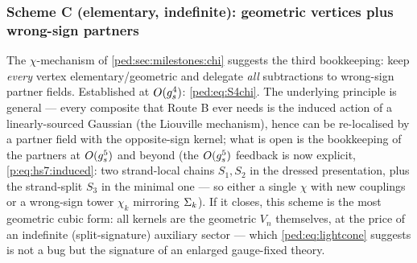 \subsubsection{Scheme C (elementary, indefinite): geometric vertices plus wrong-sign
partners}
\label{ped:sec:allorders:chi}

The $\chi$-mechanism of \cref{ped:sec:milestones:chi} suggests the third bookkeeping: keep
\emph{every} vertex elementary/geometric and delegate \emph{all} subtractions to
wrong-sign partner fields. Established at $O(g_s^4)$: \eqref{ped:eq:S4chi}.
The underlying principle is general --- every composite that Route B
ever needs is the induced action of a linearly-sourced Gaussian (the Liouville
mechanism), hence can be re-localised by a partner field with the opposite-sign kernel;
what is open is the bookkeeping of the partners at $O(g_s^5)$ and beyond (the $O(g_s^5)$
feedback is now explicit, \eqref{p:eq:hs7:induced}: two strand-local chains $S_1,S_2$ in the
dressed presentation, plus the strand-split $S_3$ in the minimal one --- so either a
single $\chi$ with new couplings or a wrong-sign tower $\chi_k$ mirroring $\Sigma_k$).
If it closes, this scheme is the
most geometric cubic form: all kernels are the geometric $V_n$ themselves, at
the price of an indefinite (split-signature) auxiliary sector --- which
\eqref{ped:eq:lightcone} suggests is not a bug but the signature of an enlarged gauge-fixed
theory.

